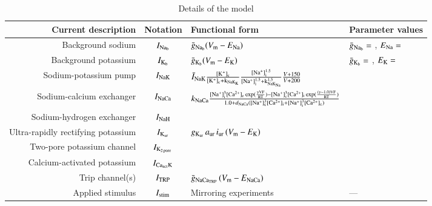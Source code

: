 \begin{table}


\begin{tabular}{r c l l}
\hline\hline
Current description & Notation & Functional form & Parameter values \\ [0.5ex]
\hline
Background sodium & $I_{\rm Na_b}$ & $\bar{g}_{\rm Na_b} (V_{\rm m} - E_{\rm Na})$ \cite{UNKNOWN}
                          & $\bar{g}_{\rm Na_b} = $ \cite{UNKNOWN}, $E_{\rm Na} = $ \cite{UNKNOWN}\\
Background potassium & $I_{\rm K_b}$ & $\bar{g}_{\rm K_b} (V_{\rm m} - E_{\rm K})$ \cite{UNKNOWN}
                          & $\bar{g}_{\rm K_b} = $ \cite{UNKNOWN}, $E_{\rm K} = $ \cite{UNKNOWN}\\
Sodium-potassium pump & $I_{\rm NaK}$ & $\bar{I}_{\rm NaK}
\frac{[\rm K^{+}]_{\rm c}}{[\rm K^{+}]_{\rm c} + k_{\rm NaK_{K}}}
\frac{[\rm Na^{+}]^{1.5}_{\rm i}}{[\rm Na^{+}]^{1.5}_{\rm i} + k^{1.5}_{\rm
    NaK_{Na}}}
\frac{V + 150}{V + 200}$\cite{Nygrenetal1998} & \cite{Nygrenetal1998}\\
Sodium-calcium exchanger & $I_{\rm NaCa}$ & $k_{\rm NaCa}
\frac{[\rm Na^{+}]^{3}_{i}[\rm Ca^{2+}]_{c} \exp(\frac{\gamma V F}{R T}) -
[\rm Na^{+}]^{3}_{c}[\rm Ca^{2+}]_{i} \exp(\frac{(\gamma - 1.0) V F}{R T})}
{1.0 + d_{\rm NaCa}([\rm Na^{+}]^{3}_{c}[\rm Ca^{2+}]_{i} + [\rm
  Na^{+}]^{3}_{i}[\rm Ca^{2+}]_{c})}$
\cite{Nygrenetal1998} & \cite{Nygrenetal1998}\\
Sodium-hydrogen exchanger & $I_{\rm NaH}$ & \cite{UNKNOWN} & \cite{UNKNOWN}\\
Ultra-rapidly rectifying potassium & $I_{\rm K_{ur}}$ & $g_{\rm
  K_{ur}}\, a_{\rm ur}\, i_{\rm ur}\, (V_{\rm m} - E_{\rm K})$ \cite{Maleckaretal2009} & \cite{Maleckaretal2009}\\
Two-pore potassium channel & $I_{\rm K_{2\, pore}}$ & \cite{UNKNOWN} & \cite{UNKNOWN}\\
Calcium-activated potassium & $I_{\rm Ca_{act}K}$ & \cite{UNKNOWN} & \cite{UNKNOWN}\\
Trip channel(s) & $I_{\rm TRP}$ & $\bar{g}_{\rm NaCa_{TRP}}\, (V_{\rm
  m} - E_{\rm NaCa})$ \cite{UNKNOWN} & \cite{UNKNOWN}\\
Applied stimulus & $ I_{\rm stim}$ & Mirroring experiments \cite{Clarketal2011} &  --- \\ [1ex]
\hline
\end{tabular}
\caption{Details of the model}
\label{table:chondrocyte-model-details}
\end{table}

